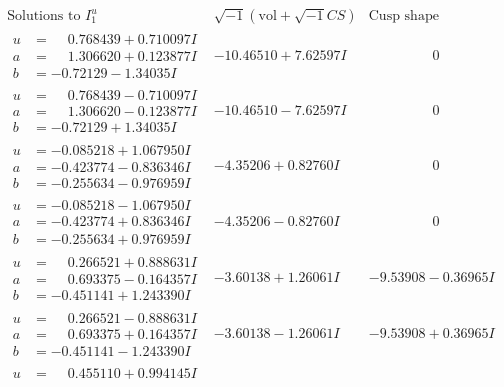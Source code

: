 \documentclass[1p]{elsarticle_modified}
\theoremstyle{definition}
\newcommand{\I}{\sqrt{-1}}
\begin{document}
$$\begin{array}{c|c|c}  
\text{Solutions to }I^u_{1}& \I (\text{vol} + \sqrt{-1}CS) & \text{Cusp shape}\\
 \hline 
\begin{aligned}
u &= \phantom{-}0.768439 + 0.710097 I \\
a &= \phantom{-}1.306620 + 0.123877 I \\
b &= -0.72129 - 1.34035 I\end{aligned}
 & -10.46510 + 7.62597 I & \phantom{-0.000000 } 0 \\ \hline\begin{aligned}
u &= \phantom{-}0.768439 - 0.710097 I \\
a &= \phantom{-}1.306620 - 0.123877 I \\
b &= -0.72129 + 1.34035 I\end{aligned}
 & -10.46510 - 7.62597 I & \phantom{-0.000000 } 0 \\ \hline\begin{aligned}
u &= -0.085218 + 1.067950 I \\
a &= -0.423774 - 0.836346 I \\
b &= -0.255634 - 0.976959 I\end{aligned}
 & -4.35206 + 0.82760 I & \phantom{-0.000000 } 0 \\ \hline\begin{aligned}
u &= -0.085218 - 1.067950 I \\
a &= -0.423774 + 0.836346 I \\
b &= -0.255634 + 0.976959 I\end{aligned}
 & -4.35206 - 0.82760 I & \phantom{-0.000000 } 0 \\ \hline\begin{aligned}
u &= \phantom{-}0.266521 + 0.888631 I \\
a &= \phantom{-}0.693375 - 0.164357 I \\
b &= -0.451141 + 1.243390 I\end{aligned}
 & -3.60138 + 1.26061 I & -9.53908 - 0.36965 I \\ \hline\begin{aligned}
u &= \phantom{-}0.266521 - 0.888631 I \\
a &= \phantom{-}0.693375 + 0.164357 I \\
b &= -0.451141 - 1.243390 I\end{aligned}
 & -3.60138 - 1.26061 I & -9.53908 + 0.36965 I \\ \hline\begin{aligned}
u &= \phantom{-}0.455110 + 0.994145 I \\

\end{aligned}
\end{array}$$
\end{document}
